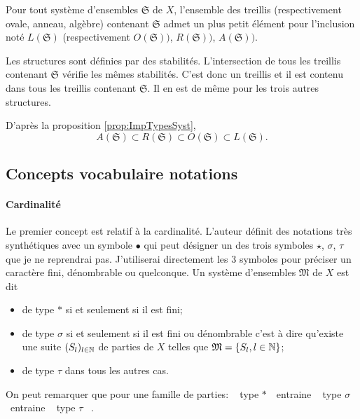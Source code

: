 \begin{propn}
  Pour tout système d'ensembles $\mathfrak{S}$ de $X$, l'ensemble des treillis (respectivement ovale, anneau, algèbre) contenant $\mathfrak{S}$ admet un plus petit élément pour l'inclusion noté $L(\mathfrak{S})$ (respectivement $O(\mathfrak{S}))$, $R(\mathfrak{S}))$, $A(\mathfrak{S}))$.
\end{propn}
\begin{demo}
Les structures sont définies par des stabilités. L'intersection de tous les treillis contenant $\mathfrak{S}$ vérifie les mêmes stabilités. C'est donc un treillis et il est contenu dans tous les treillis contenant $\mathfrak{S}$. Il en est de même pour les trois autres structures.
\end{demo}
D'après la proposition \ref{prop:ImpTypesSyst},
\begin{displaymath}
 A(\mathfrak{S}) \subset R(\mathfrak{S}) \subset O(\mathfrak{S}) \subset L(\mathfrak{S}).
\end{displaymath}

\subsection{Concepts vocabulaire notations}\label{SubSec:ConcVocNot}

\paragraph{Cardinalité}
Le premier concept est relatif à la cardinalité. L'auteur définit des notations très synthétiques avec un symbole $\bullet$ qui peut  désigner un des trois symboles $\star$, $\sigma$, $\tau$ que je ne reprendrai pas. J'utiliserai directement les 3 symboles pour préciser un caractère fini, dénombrable ou quelconque.\newline
Un système d'ensembles $\mathfrak{M}$ de $X$ est dit
\begin{itemize}
 \item de type $*$ si et seulement si il est fini;
 \item de type $\sigma$ si et seulement si il est fini ou dénombrable c'est à dire qu'existe une suite $(S_l)_{l\in \mathbb{N}}$ de parties de $X$ telles que $\mathfrak{M}= \left\lbrace S_l , l\in \mathbb{N} \right\rbrace$;
 \item de type $\tau$ dans tous les autres cas.
\end{itemize}
On peut remarquer que pour une famille de parties: \og~ type $*$~\fg{}\, entraine \og~ type $\sigma$ ~\fg{} \, entraine \og~ type $\tau$ ~\fg{}.

